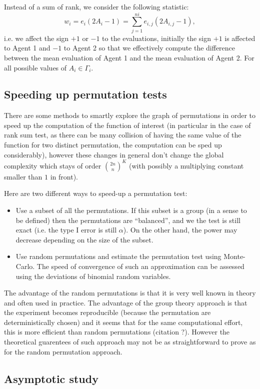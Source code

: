 \documentclass{article}
\theoremstyle{plain}
\theoremstyle{remark}
\newcommand{\1}{\mathbbm{1}}
\numberwithin{equation}{section}
\begin{document}
Instead of a sum of rank, we consider the following statistic: 
$$w_i=e_i(2A_i-1)=\sum_{j=1}^{ni} e_{i,j}(2A_{i,j}-1),$$
i.e. we affect the sign $+1$ or $-1$ to the evaluations, initially the sign $+1$ is affected to Agent 1 and $-1$ to Agent 2 so that we effectively compute the difference between the mean evaluation of Agent 1 and the mean evaluation of Agent 2. For all possible values of $A_i\in \Gamma_i$.

\subsection{Speeding up permutation tests}
There are some methods to smartly explore the graph of permutations in order to speed up the computation of the function of interest (in particular in the case of rank sum test, as there can be many collision of having the same value of the function for two distinct permutation, the computation can be sped up considerably), however these changes in general don't change the global complexity which stays of order ${2n \choose n}^K$ (with possibly a multiplying constant smaller than $1$ in front).

Here are two different ways to speed-up a permutation test:
\begin{itemize}
\item Use a subset of all the permutations. If this subset is a group (in a sense to be defined) then the permutations are ``balanced'', and we the test is still exact (i.e. the type I error is still $\alpha$). On the other hand, the power may decrease depending on the size of the subset.
\item Use random permutations and estimate the permutation test using Monte-Carlo. The speed of convergence of such an approximation can be assessed using the deviations of binomial random variables.
\end{itemize}
The advantage of the random permutations is that it is very well known in theory and often used in practice. The advantage of the group theory approach is that the experiment becomes reproducible (because the permutation are deterministically chosen) and it seems that for the same computational effort, this is more efficient than random permutations (citation ?). However the theoretical guarentees of such approach may not be as straightforward to prove as for the random permutation approach. 

\subsection{Asymptotic study}
\end{document}
